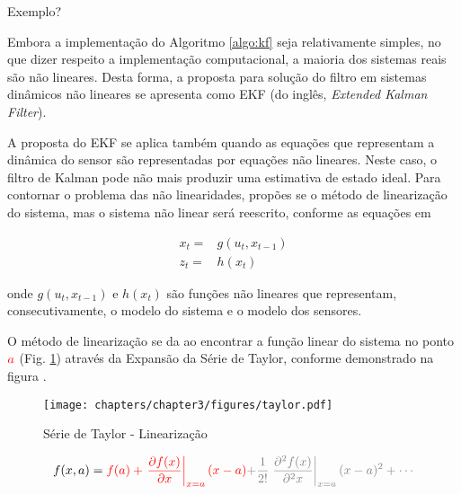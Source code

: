 Exemplo?


Embora a implementação do Algoritmo \ref{algo:kf} seja relativamente simples, no que dizer respeito a implementação computacional, a 
maioria dos sistemas reais são não lineares. Desta forma, a proposta para solução do filtro em sistemas dinâmicos não lineares se apresenta como
EKF (do inglês, \textit{Extended Kalman Filter}).

A proposta do EKF se aplica também quando as equações que representam a dinâmica do sensor são representadas por equações não lineares.
Neste caso, o filtro de Kalman pode não mais produzir uma estimativa de estado ideal. 
Para contornar o problema das não linearidades, propões se o método de linearização do sistema, mas o sistema não linear será reescrito, conforme as equações em 


    \begin{equation}
        \begin{split}
        x_t = & g(u_t, x_{t-1})\\
        z_t = & h(x_t)
        \end{split}
    \end{equation}
    
onde $g(u_t, x_{t-1})$ e $h(x_t)$ são funções não lineares que representam, consecutivamente, 
o modelo do sistema e o modelo dos sensores.



O método de linearização se da ao encontrar a função linear do sistema no ponto $\textcolor{red}{a}$ (Fig. \ref{fig:taylor}) através da Expansão da Série de Taylor, conforme demonstrado na figura .

\begin{figure}
    \centering
    \texttt{[image: chapters/chapter3/figures/taylor.pdf]}
    \caption{Série de Taylor - Linearização}
    \label{fig:taylor}
\end{figure}

\begin{equation}
    \label{eq:taylor1}
    f(x,a) = \textcolor{red}{f(a) + \left. \frac{\partial f(x)}{\partial x} \right\vert_{x=a}(x-a)}
    \textcolor{gray}{+\frac{1}{2!}\left. \frac{\partial^2 f(x)}{\partial^2 x} \right\vert_{x=a}(x-a)^2 + \cdots}
\end{equation}

